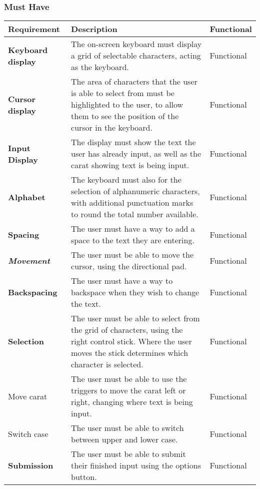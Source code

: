 \documentclass[requirements.tex]{subfiles}
\begin{document}
\subsubsection{Must Have} %
\label{ssub:after_must_have}
\begin{table}[H]
\small
\begin{tabularx}{\textwidth}{| l | X | l |}
 \hline
 \textbf{Requirement} & \textbf{Description} & \textbf{Functional} \\
 \hline
 \textbf{Keyboard display} & The on-screen keyboard must display a grid of
 selectable characters, acting as the keyboard. & Functional \\
 \hline
 \textbf{Cursor display} & The area of characters that the user is able to
 select from must be highlighted to the user, to allow them to see the position
 of the cursor in the keyboard. & Functional \\
 \hline
 \textbf{Input Display} & The display must show the text the user has already
 input, as well as the carat showing text is being input. & Functional \\
 \hline
 \textbf{Alphabet} & The keyboard must also for the selection of alphanumeric
 characters, with additional punctuation marks to round the total number
 available. & Functional \\
 \hline
 \textbf{Spacing} & The user must have a way to add a space to the text they are
 entering. & Functional \\
 \hline
 \textbf{\emph{Movement}} & The user must be able to move the cursor, using the
 directional pad. & Functional \\
 \hline
 \textbf{Backspacing} & The user must have a way to backspace when they wish to
 change the text. & Functional \\
 \hline
 \textbf{Selection} & The user must be able to select from the grid of
 characters, using the right control stick. Where the user moves the stick
 determines which character is selected. & Functional \\
 \hline
 Move carat & The user must be able to use the triggers to move the carat left
 or right, changing where text is being input. & Functional \\
 \hline
 Switch case & The user must be able to switch between upper and lower case.
 & Functional \\
 \hline
 \textbf{Submission} & The user must be able to submit their finished input
 using the options button. & Functional \\
 \hline
\end{tabularx}
\end{table}
\end{document}

